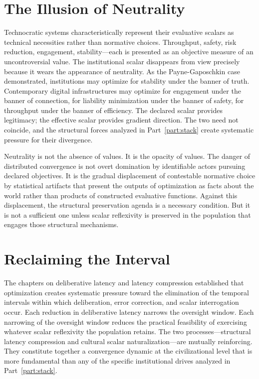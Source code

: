 \documentclass[12pt, oneside]{book}
\theoremstyle{plain}
\theoremstyle{definition}
\theoremstyle{remark}
\theoremstyle{definition}
\begin{document}
\section{The Illusion of Neutrality}

Technocratic systems characteristically represent their evaluative scalars as
technical necessities rather than normative choices. Throughput, safety, risk
reduction, engagement, stability---each is presented as an objective measure of
an uncontroversial value. The institutional scalar disappears from view precisely
because it wears the appearance of neutrality. As the Payne-Gaposchkin case
demonstrated, institutions may optimize for stability under the banner of truth.
Contemporary digital infrastructures may optimize for engagement under the banner
of connection, for liability minimization under the banner of safety, for throughput
under the banner of efficiency. The declared scalar provides legitimacy; the
effective scalar provides gradient direction. The two need not coincide, and the
structural forces analyzed in Part~\ref{part:stack} create systematic pressure
for their divergence.

Neutrality is not the absence of values. It is the opacity of values. The danger
of distributed convergence is not overt domination by identifiable actors pursuing
declared objectives. It is the gradual displacement of contestable normative choice
by statistical artifacts that present the outputs of optimization as facts about
the world rather than products of constructed evaluative functions. Against this
displacement, the structural preservation agenda is a necessary condition. But it
is not a sufficient one unless scalar reflexivity is preserved in the population
that engages those structural mechanisms.

\section{Reclaiming the Interval}

The chapters on deliberative latency and latency compression established that
optimization creates systematic pressure toward the elimination of the temporal
intervals within which deliberation, error correction, and scalar interrogation
occur. Each reduction in deliberative latency narrows the oversight window. Each
narrowing of the oversight window reduces the practical feasibility of exercising
whatever scalar reflexivity the population retains. The two processes---structural
latency compression and cultural scalar naturalization---are mutually reinforcing.
They constitute together a convergence dynamic at the civilizational level that
is more fundamental than any of the specific institutional drives analyzed in
Part~\ref{part:stack}.
\end{document}

